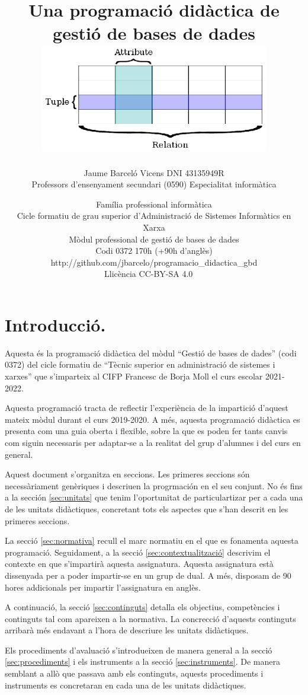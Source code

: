 \documentclass[catalan, a4paper, 12pt, titlepage]{article}
\title{Una programació didàctica de \\
gestió de bases de dades\\
	\includegraphics[width=10cm]{database.eps}
	}
\author{
	Jaume Barceló Vicens
	DNI 43135949R\\
	Professors d'ensenyament secundari (0590)
	Especialitat informàtica}
\date{
	Família professional informàtica \\
	Cicle formatiu de grau superior d’Administració de Sistemes Informàtics en Xarxa\\
	Mòdul professional de gestió de bases de dades\\
	Codi 0372 170h (+90h d'anglès)\\
	http://github.com/jbarcelo/programacio\_didactica\_gbd \\
	Llicència CC-BY-SA 4.0 \faCreativeCommons\ \faCreativeCommonsBy\ \faCreativeCommonsSa}
\begin{document}
\pagestyle{empty}

\maketitle

\tableofcontents 

\pagestyle{fancy}

\section{Introducció.}

Aquesta és la programació didàctica del mòdul ``Gestió de bases de dades'' (codi 0372) del cicle formatiu de ``Tècnic superior en administració de sistemes i xarxes'' que s'imparteix al CIFP Francesc de Borja Moll el curs escolar 2021-2022.

Aquesta programació tracta de reflectir l'experiència de la impartició d'aquest mateix mòdul durant el curs 2019-2020. A més, aquesta programació didàctica es presenta com una guia oberta i flexible, sobre la que es poden fer tants canvis com siguin necessaris per adaptar-se a la realitat del grup d'alumnes i del curs en general.

Aquest document s'organitza en seccions.
Les primeres seccions són necessàriament genèriques i descriuen la progrmación en el seu conjunt.
No és fins a la sección \ref{sec:unitats} que tenim l'oportunitat de particulartizar per a cada una de les unitats didàctiques, concretant tots els aspectes que s'han descrit en les primeres seccions.

La secció \ref{sec:normativa} recull el marc normatiu en el que es fonamenta aquesta programació.
Seguidament, a la secció \ref{sec:contextualització} descrivim el contexte en que s'impartirà aquesta assignatura.
Aquesta assignatura està dissenyada per a poder impartir-se en un grup de dual.
A més, disposam de 90 hores addicionals per impartir l'assignatura en anglès.

A continuació, la secció \ref{sec:continguts} detalla els objectius, competències i continguts tal com apareixen a la normativa.
La concrecció d'aquests continguts arribarà més endavant a l'hora de descriure les unitats didàctiques.

Els procediments d'avaluació s'introdueixen de manera general a la secció \ref{sec:procediments} i els instruments a la secció \ref{sec:instruments}.
De manera semblant a allò que passava amb els continguts, aquests procediments i instruments es concretaran en cada una de les unitats didàctiques.
\end{document}
